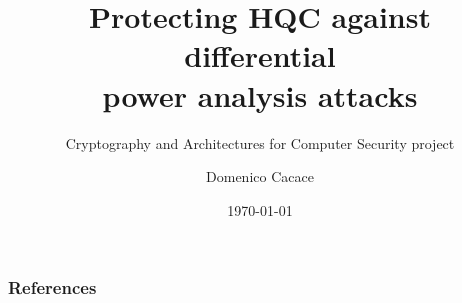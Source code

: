 \documentclass[tikz]{beamer}
\title{Protecting HQC against differential\\ power analysis attacks\\}
\subtitle{Cryptography and Architectures for Computer Security project}
\author{Domenico Cacace}
\date{\today}
\begin{document}
\begin{frame}
    \maketitle
\end{frame}








\begin{frame}[allowframebreaks]
    \frametitle{References}
    
    
\end{frame}

%
\end{document}
